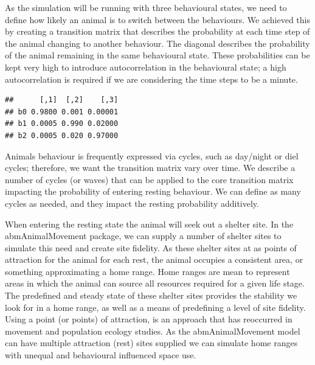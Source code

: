 \documentclass[10pt,a4paper]{article}
\begin{document}
As the simulation will be running with three behavioural states, we need to define how likely an animal is to switch between the behaviours.
We achieved this by creating a transition matrix that describes the probability at each time step of the animal changing to another behaviour.
The diagonal describes the probability of the animal remaining in the same behavioural state.
These probabilities can be kept very high to introduce autocorrelation in the behavioural state; a high autocorrelation is required if we are considering the time steps to be a minute.

\begin{verbatim}
##      [,1]  [,2]    [,3]
## b0 0.9800 0.001 0.00001
## b1 0.0005 0.990 0.02000
## b2 0.0005 0.020 0.97000
\end{verbatim}

Animals behaviour is frequently expressed via cycles, such as day/night or diel cycles; therefore, we want the transition matrix vary over time.
We describe a number of cycles (or waves) that can be applied to the core transition matrix impacting the probability of entering resting behaviour.
We can define as many cycles as needed, and they impact the resting probability additively.

When entering the resting state the animal will seek out a shelter site.
In the abmAnimalMovement package, we can supply a number of shelter sites to simulate this need and create site fidelity.
As these shelter sites at as points of attraction for the animal for each rest, the animal occupies a consistent area, or something approximating a home range.
Home ranges are mean to represent areas in which the animal can source all resources required for a given life stage.
The predefined and steady state of these shelter sites provides the stability we look for in a home range, as well as a means of predefining a level of site fidelity.
Using a point (or points) of attraction, is an approach that has reoccurred in movement and population ecology studies.
As the abmAnimalMovement model can have multiple attraction (rest) sites supplied we can simulate home ranges with unequal and behavioural influenced space use.
\end{document}

